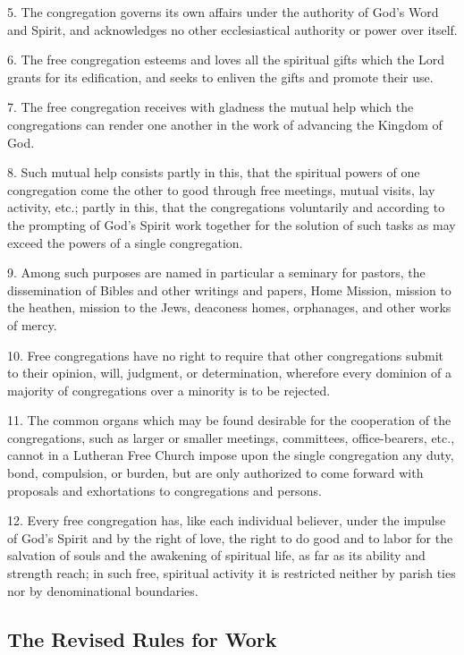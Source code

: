5. The congregation governs its own affairs under the authority of God’s Word and Spirit, and acknowledges no other ecclesiastical authority or power over itself.

6. The free congregation esteems and loves all the spiritual gifts which the Lord grants for its edification, and seeks to enliven the gifts and promote their use.

7. The free congregation receives with gladness the mutual help which the congregations can render one another in the work of advancing the Kingdom of God.

8. Such mutual help consists partly in this, that the spiritual powers of one congregation come the other to good through free meetings, mutual visits, lay activity, etc.; partly in this, that the congregations voluntarily and according to the prompting of God’s Spirit work together for the solution of such tasks as may exceed the powers of a single congregation.

9. Among such purposes are named in particular a seminary for pastors, the dissemination of Bibles and other writings and papers, Home Mission, mission to the heathen, mission to the Jews, deaconess homes, orphanages, and other works of mercy.

10. Free congregations have no right to require that other congregations submit to their opinion, will, judgment, or determination, wherefore every dominion of a majority of congregations over a minority is to be rejected.

11. The common organs which may be found desirable for the cooperation of the congregations, such as larger or smaller meetings, committees, office-bearers, etc., cannot in a Lutheran Free Church impose upon the single congregation any duty, bond, compulsion, or burden, but are only authorized to come forward with proposals and exhortations to congregations and persons.

12. Every free congregation has, like each individual believer, under the impulse of God’s Spirit and by the right of love, the right to do good and to labor for the salvation of souls and the awakening of spiritual life, as far as its ability and strength reach; in such free, spiritual activity it is restricted neither by parish ties nor by denominational boundaries.


\pagebreak
\subsection{The Revised Rules for Work}

